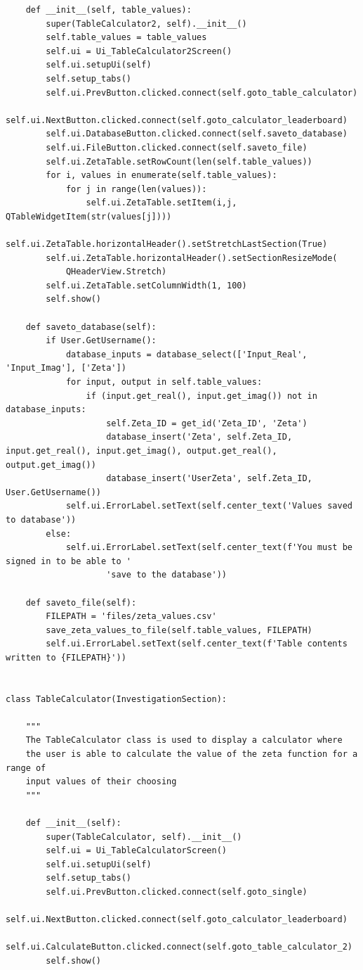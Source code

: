 \documentclass[12pt]{article}
\begin{document}
\begin{lstlisting}
    def __init__(self, table_values):
        super(TableCalculator2, self).__init__()
        self.table_values = table_values
        self.ui = Ui_TableCalculator2Screen()
        self.ui.setupUi(self)
        self.setup_tabs()
        self.ui.PrevButton.clicked.connect(self.goto_table_calculator)
        self.ui.NextButton.clicked.connect(self.goto_calculator_leaderboard)
        self.ui.DatabaseButton.clicked.connect(self.saveto_database)
        self.ui.FileButton.clicked.connect(self.saveto_file)
        self.ui.ZetaTable.setRowCount(len(self.table_values))
        for i, values in enumerate(self.table_values):
            for j in range(len(values)):
                self.ui.ZetaTable.setItem(i,j, QTableWidgetItem(str(values[j])))
        self.ui.ZetaTable.horizontalHeader().setStretchLastSection(True)
        self.ui.ZetaTable.horizontalHeader().setSectionResizeMode(
            QHeaderView.Stretch)
        self.ui.ZetaTable.setColumnWidth(1, 100)
        self.show()

    def saveto_database(self):
        if User.GetUsername():
            database_inputs = database_select(['Input_Real', 'Input_Imag'], ['Zeta'])
            for input, output in self.table_values:
                if (input.get_real(), input.get_imag()) not in database_inputs:
                    self.Zeta_ID = get_id('Zeta_ID', 'Zeta')
                    database_insert('Zeta', self.Zeta_ID, input.get_real(), input.get_imag(), output.get_real(), output.get_imag())
                    database_insert('UserZeta', self.Zeta_ID, User.GetUsername())
            self.ui.ErrorLabel.setText(self.center_text('Values saved to database'))
        else:
            self.ui.ErrorLabel.setText(self.center_text(f'You must be signed in to be able to '
                    'save to the database'))

    def saveto_file(self):
        FILEPATH = 'files/zeta_values.csv'
        save_zeta_values_to_file(self.table_values, FILEPATH)
        self.ui.ErrorLabel.setText(self.center_text(f'Table contents written to {FILEPATH}'))


class TableCalculator(InvestigationSection):

    """
    The TableCalculator class is used to display a calculator where
    the user is able to calculate the value of the zeta function for a range of
    input values of their choosing
    """

    def __init__(self):
        super(TableCalculator, self).__init__()
        self.ui = Ui_TableCalculatorScreen()
        self.ui.setupUi(self)
        self.setup_tabs()
        self.ui.PrevButton.clicked.connect(self.goto_single)
        self.ui.NextButton.clicked.connect(self.goto_calculator_leaderboard)
        self.ui.CalculateButton.clicked.connect(self.goto_table_calculator_2)
        self.show()


\end{lstlisting}
\end{document}
